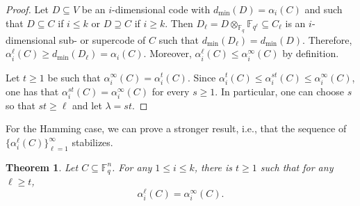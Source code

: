 \documentclass[12pt]{amsart}
\numberwithin{equation}{section}
\newtheorem{theorem}{Theorem}[section]
\theoremstyle{definition}
\newcommand{\FF}{\mathbb{F}}
\begin{document}
\begin{proof}
Let $D\subseteq V$ be an $i$-dimensional code with $d_{\min}(D)=\alpha_i(C)$ and such that $D\subseteq C$ if $i\leq k$ or $D\supseteq C$ if $i\geq k$.
Then $D_\ell=D\otimes_{\FF_q}\FF_{q^\ell}\subseteq C_\ell$ is an $i$-dimensional sub- or supercode of $C$ such that $d_{\min}(D_\ell)=d_{\min}(D)$. Therefore, $\alpha_i^\ell(C)\geq d_{\min}(D_\ell)=\alpha_i(C)$. Moreover, $\alpha_i^\ell(C)\leq \alpha^\infty_i(C)$ by definition. 

Let $t\geq 1$ be such that $\alpha^\infty_i(C)=\alpha_i^t(C)$. Since $\alpha_i^t(C)\leq\alpha_i^{st}(C)\leq\alpha_i^\infty(C)$, one has that $\alpha_i^{st}(C)=\alpha_i^\infty(C)$ for every $s\geq 1$. In particular, one can choose $s$ so that $st\geq\ell$ and let $\lambda=st$.
\end{proof}

For the Hamming case, we can prove a stronger result, i.e., that the sequence of $\{\alpha_i^\ell(C)\}_{\ell=1}^\infty$ stabilizes. 

\begin{theorem}
 Let $C\subseteq\mathbb{F}_q^n$. For any $1\leq i\leq k$, there is $t\geq 1$ such that for any $\ell\geq t$, 
 $$\alpha_i^\ell(C)=\alpha_i^\infty(C).$$
\end{theorem}
\end{document}
